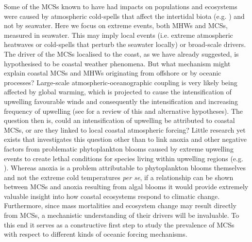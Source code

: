 \documentclass[a4paper,10pt,review]{elsarticle}
\begin{document}
Some of the MCSs known to have had impacts on populations and ecosystems were caused by atmospheric cold-spells that affect the intertidal biota (e.g. \cite{Gunter1941, Firth2011}) and not by seawater. Here we focus on extreme events, both MHWs and MCSs, measured in seawater. This may imply local events (i.e. extreme atmospheric heatwaves or cold-spells that perturb the seawater locally) or broad-scale drivers. The driver of the MCSs localised to the coast, as we have already suggested, is hypothesised to be coastal weather phenomena. But what mechanism might explain coastal MCSs and MHWs originating from offshore or by oceanic processes? Large-scale atmospheric-oceanographic coupling is very likely being affected by global warming, which is projected to cause the intensification of upwelling favourable winds and consequently the intensification and increasing frequency of upwelling (see \citet{Garcia-Reyes2015} for a review of this and alternative hypotheses). The question then is, could an intensification of upwelling be attributed to coastal MCSs, or are they linked to local coastal atmospheric forcing? Little research yet exists that investigates this question other than to link anoxia and other negative factors from problematic phytoplankton blooms caused by extreme upwelling events to create lethal conditions for species living within upwelling regions (e.g. \cite{Laboy-nieves2001}). Whereas anoxia is a problem attributable to phytoplankton blooms themselves \citep{Diaz2008} and not the extreme cold temperatures \textit{per se}, if a relationship can be shown between MCSs and anoxia resulting from algal blooms it would provide extremely valuable insight into how coastal ecosystems respond to climatic change. Furthermore, since mass mortalities and ecosystem change may result directly from MCSs, a mechanistic understanding of their drivers will be invaluable. To this end it serves as a constructive first step to study the prevalence of MCSs with respect to different kinds of oceanic forcing mechanisms.
\end{document}
